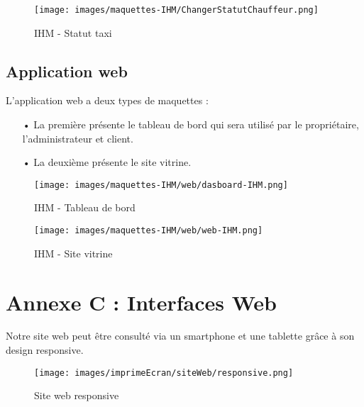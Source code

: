 {\begin{minipage}[c]{.46\linewidth}
 \end{minipage}\hfill
\begin{minipage}[c]{.46\linewidth}
\begin{figure}[H]
\centering
\texttt{[image: images/maquettes-IHM/ChangerStatutChauffeur.png]}
\caption{IHM - Statut taxi}
\end{figure}

\end{minipage}



\newpage
\subsection*{Application web}
L’application web a deux  types de maquettes :
\begin{itemize}
\item[•] La première présente le tableau de bord qui sera utilisé par le propriétaire, l’administrateur et client.
\item[•] La deuxième présente le site vitrine.
\end{itemize}

\begin{figure}[H]
\centering
\texttt{[image: images/maquettes-IHM/web/dasboard-IHM.png]}
\caption{IHM - Tableau de bord}
\end{figure}

\begin{figure}[H]
\centering
\texttt{[image: images/maquettes-IHM/web/web-IHM.png]}
\caption{IHM - Site vitrine}
\end{figure}





\section*{Annexe C : Interfaces Web}


\begin{minipage}[c]{.35\linewidth}
Notre site web peut être consulté via un smartphone et une tablette grâce à son design responsive.
 \end{minipage}\hfill
\begin{minipage}[c]{.6\linewidth}
\begin{figure}[H]
\centering
\texttt{[image: images/imprimeEcran/siteWeb/responsive.png]}
\caption{Site web responsive}
\end{figure}
\end{minipage}

}
